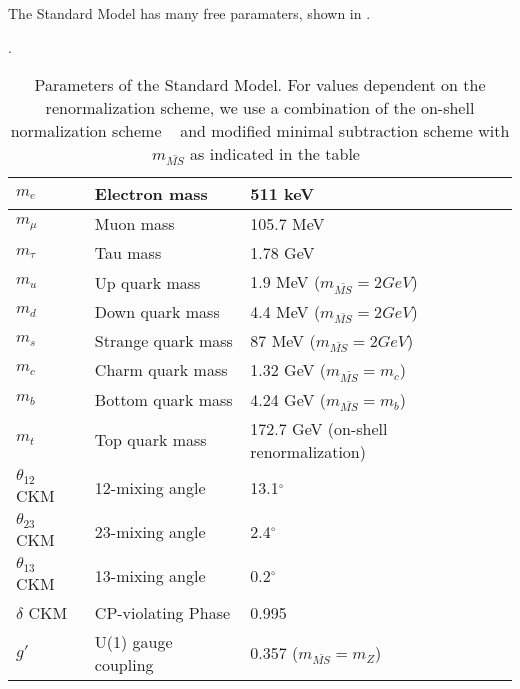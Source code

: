 The Standard Model has many free paramaters, shown in .
\begin{table}
\centering
\caption{Parameters of the Standard Model.  For values dependent on the renormalization scheme, we use a combination of the on-shell normalization scheme ~\cite{Hollik:1988ii, Bardin:1989vz, Kennedy:1988rt, Sirlin:1980nh} and  modified minimal subtraction scheme with $m_{\bar{MS}}$ as indicated in the table~\cite{ Fanchiotti:1992tu}}.
\label{tab:sm_free_parameters}
\begin{tabular}{| l | l | l |}
\hline
$m_e$             & Electron mass                  & 511 keV                           \\ \hline
$m_\mu$           & Muon mass                      & 105.7 MeV                         \\ \hline
$m_\tau$          & Tau mass                       & 1.78 GeV                          \\ \hline
$m_u$             & Up quark mass                  & 1.9 MeV   ($m_{\bar{MS}} = 2 GeV$)                        \\ \hline
$m_d$             & Down quark mass                & 4.4 MeV   ($m_{\bar{MS}} = 2 GeV$)                       \\ \hline
$m_s$             & Strange quark mass             & 87 MeV    ($m_{\bar{MS}} = 2 GeV$)                        \\ \hline
$m_c$             & Charm quark mass               & 1.32 GeV  ($m_{\bar{MS}} = m_c$)                        \\ \hline
$m_b$             & Bottom quark mass              & 4.24 GeV  ($m_{\bar{MS}} = m_b$)  \\ \hline
$m_t$             & Top quark mass                 & 172.7 GeV (on-shell renormalization)                       \\ \hline
$\theta_{12}$ CKM & 12-mixing angle                & 13.1$^{\circ}$                    \\ \hline
$\theta_{23}$ CKM & 23-mixing angle                & 2.4$^{\circ}$                     \\ \hline
$\theta_{13}$ CKM & 13-mixing angle                & 0.2$^{\circ}$                     \\ \hline
$\delta$ CKM      & CP-violating Phase             & 0.995                             \\ \hline
$g'$              & U(1) gauge coupling            & 0.357     ($m_{\bar{MS}} = m_Z$)                         \\ \hline

\end{tabular}
\end{table}
